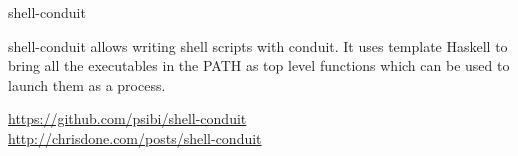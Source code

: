 \documentclass[DIV16,twocolumn,10pt]{scrreprt}
\begin{document}
\begin{hcarentry}{shell-conduit}
\makeheader

shell-conduit allows writing shell scripts with conduit. It uses
template Haskell to bring all the executables in the PATH as top level
functions which can be used to launch them as a process.

\FurtherReading
  \url{https://github.com/psibi/shell-conduit} \\
  \url{http://chrisdone.com/posts/shell-conduit}
\end{hcarentry}
\end{document}
